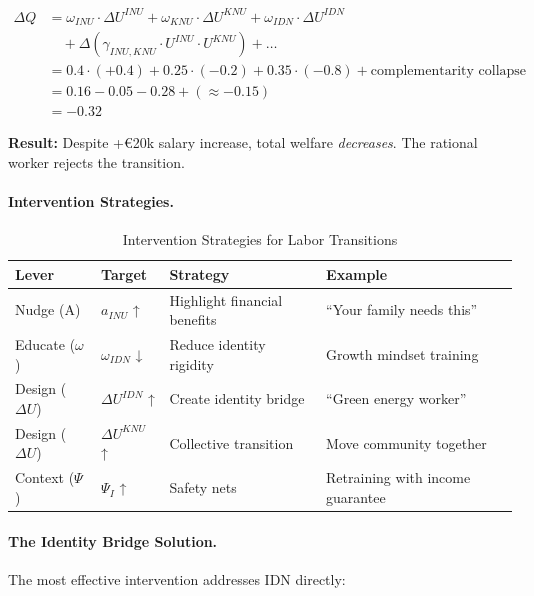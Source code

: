 \begin{align}
\Delta Q &= \omega_{INU} \cdot \Delta U^{INU} + \omega_{KNU} \cdot \Delta U^{KNU} + \omega_{IDN} \cdot \Delta U^{IDN} \nonumber \\
&\quad + \Delta(\gamma_{INU,KNU} \cdot U^{INU} \cdot U^{KNU}) + \ldots \nonumber \\
&= 0.4 \cdot (+0.4) + 0.25 \cdot (-0.2) + 0.35 \cdot (-0.8) + \text{complementarity collapse} \nonumber \\
&= 0.16 - 0.05 - 0.28 + (\approx -0.15) \nonumber \\
&= \mathbf{-0.32}
\end{align}

\textbf{Result:} Despite +\euro{20k} salary increase, total welfare \emph{decreases}.
The rational worker rejects the transition.

\paragraph{Intervention Strategies.}

\begin{table}[htbp]
\centering
\caption{Intervention Strategies for Labor Transitions}
\label{tab:labor-interventions}
\renewcommand{\arraystretch}{1.3}
\begin{tabular}{@{}llll@{}}
\toprule
\textbf{Lever} & \textbf{Target} & \textbf{Strategy} & \textbf{Example} \\
\midrule
Nudge (A) & $a_{INU}$ ↑ & Highlight financial benefits & ``Your family needs this'' \\
Educate ($\omega$) & $\omega_{IDN}$ ↓ & Reduce identity rigidity & Growth mindset training \\
Design ($\Delta U$) & $\Delta U^{IDN}$ ↑ & Create identity bridge & ``Green energy worker'' \\
Design ($\Delta U$) & $\Delta U^{KNU}$ ↑ & Collective transition & Move community together \\
Context ($\Psi$) & $\Psi_I$ ↑ & Safety nets & Retraining with income guarantee \\
\bottomrule
\end{tabular}
\end{table}

\paragraph{The Identity Bridge Solution.}
The most effective intervention addresses IDN directly:

